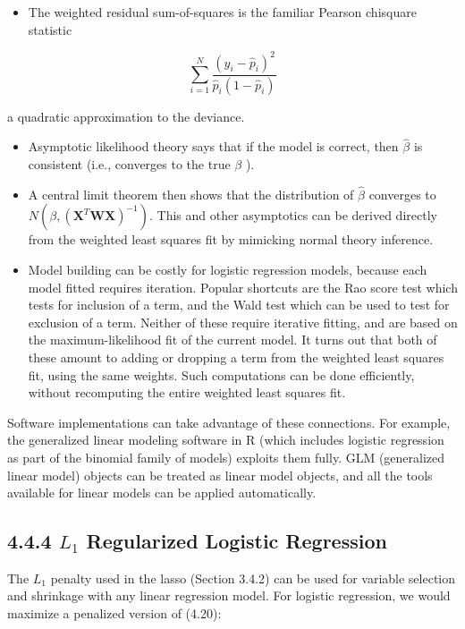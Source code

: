 \documentclass[10pt]{article}
\begin{document}
\begin{itemize}
  \item The weighted residual sum-of-squares is the familiar Pearson chisquare statistic
\end{itemize}


\begin{equation*}
\sum_{i=1}^{N} \frac{\left(y_{i}-\hat{p}_{i}\right)^{2}}{\hat{p}_{i}\left(1-\hat{p}_{i}\right)} \tag{4.30}
\end{equation*}


a quadratic approximation to the deviance.

\begin{itemize}
  \item Asymptotic likelihood theory says that if the model is correct, then $\hat{\beta}$ is consistent (i.e., converges to the true $\beta$ ).
  \item A central limit theorem then shows that the distribution of $\hat{\beta}$ converges to $N\left(\beta,\left(\mathbf{X}^{T} \mathbf{W} \mathbf{X}\right)^{-1}\right)$. This and other asymptotics can be derived directly from the weighted least squares fit by mimicking normal theory inference.
  \item Model building can be costly for logistic regression models, because each model fitted requires iteration. Popular shortcuts are the Rao score test which tests for inclusion of a term, and the Wald test which can be used to test for exclusion of a term. Neither of these require iterative fitting, and are based on the maximum-likelihood fit of the current model. It turns out that both of these amount to adding or dropping a term from the weighted least squares fit, using the same weights. Such computations can be done efficiently, without recomputing the entire weighted least squares fit.
\end{itemize}

Software implementations can take advantage of these connections. For example, the generalized linear modeling software in R (which includes logistic regression as part of the binomial family of models) exploits them fully. GLM (generalized linear model) objects can be treated as linear model objects, and all the tools available for linear models can be applied automatically.

\subsection*{4.4.4 $L_{1}$ Regularized Logistic Regression}
The $L_{1}$ penalty used in the lasso (Section 3.4.2) can be used for variable selection and shrinkage with any linear regression model. For logistic regression, we would maximize a penalized version of (4.20):
\end{document}
